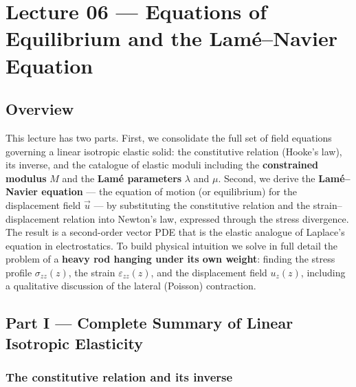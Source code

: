 
\section{Lecture 06 — Equations of Equilibrium and the Lamé–Navier Equation}\label{sec:lec06}
\date{April 27, 2025}

\subsection*{Overview}
This lecture has two parts. First, we consolidate the full set of field equations governing a linear isotropic elastic solid: the constitutive relation (Hooke's law), its inverse, and the catalogue of elastic moduli including the \textbf{constrained modulus} $M$ and the \textbf{Lamé parameters} $\lambda$ and $\mu$. Second, we derive the \textbf{Lamé–Navier equation} — the equation of motion (or equilibrium) for the displacement field $\vec{u}$ — by substituting the constitutive relation and the strain–displacement relation into Newton's law, expressed through the stress divergence. The result is a second-order vector PDE that is the elastic analogue of Laplace's equation in electrostatics. To build physical intuition we solve in full detail the problem of a \textbf{heavy rod hanging under its own weight}: finding the stress profile $\sigma_{zz}(z)$, the strain $\varepsilon_{zz}(z)$, and the displacement field $u_z(z)$, including a qualitative discussion of the lateral (Poisson) contraction.

\subsection*{Part I — Complete Summary of Linear Isotropic Elasticity}

\subsubsection*{The constitutive relation and its inverse}

